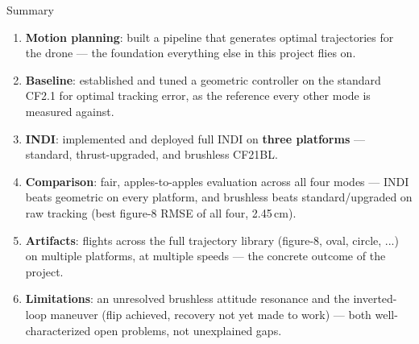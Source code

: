 \documentclass[aspectratio=169,11pt]{beamer}
\begin{document}
\begin{frame}{Summary}
\begin{small}
\begin{enumerate}
  \setlength{\itemsep}{0.2cm}
  \item \textbf{Motion planning}: built a pipeline that generates optimal trajectories for the
        drone --- the foundation everything else in this project flies on.
  \item \textbf{Baseline}: established and tuned a geometric controller on the standard CF2.1 for
        optimal tracking error, as the reference every other mode is measured against.
  \item \textbf{INDI}: implemented and deployed full INDI on \textbf{three platforms} ---
        standard, thrust-upgraded, and brushless CF21BL.
  \item \textbf{Comparison}: fair, apples-to-apples evaluation across all four modes --- INDI
        beats geometric on every platform, and brushless beats standard/upgraded on raw tracking
        (best figure-8 RMSE of all four, 2.45\,cm).
  \item \textbf{Artifacts}: flights across the full trajectory library (figure-8, oval, circle,
        ...) on multiple platforms, at multiple speeds --- the concrete outcome of the project.
  \item \textbf{Limitations}: an unresolved brushless attitude resonance and the inverted-loop
        maneuver (flip achieved, recovery not yet made to work) --- both well-characterized open
        problems, not unexplained gaps.
\end{enumerate}
\end{small}
\end{frame}
\end{document}
